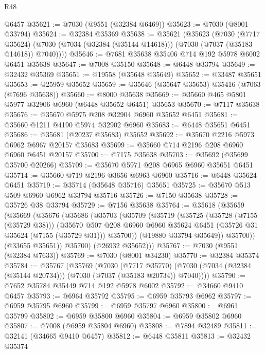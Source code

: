 \begin{lexlean}{R48}
\begin{coremodule}
    @6457
@35621 := @7030 (@9551 (@32384 @6469))
@35623 := @7030 (@8001 @33794)
@35624 := @32384 @35369
@35638 := @35621
    (@35623
      (@7030
        (@7717 @35624)
        (@7030 (@7034 (@32384 (@35144 @14618))) (@7030 (@7037 (@35183 @14618)) @7040))))
@35646 := @7681 @35638 @35406 @714 @192 @5978 @6002 @6451 @35638
@35647 := @7008 @35150
@35648 := @6448 @33794
@35649 := @32432 @35369
@35651 := @19558 (@35648 @35649)
@35652 := @33487 @35651
@35653 := @25959 @35652
@35659 := @35646 (@35647 @35653) @35416 (@7063 (@7696 @35638))
@35660 := @8000 @35638
@35669 := @35660 @465 @5801 @5977 @32906 @6960 (@6448 @35652 @6451) @35653
@35670 := @7117 @35638
@35676 := @35670 @5975 @208 @32904 @6960 @35652 @6451
@35681 := @35660 @1211 @4190 @5974 @32902 @6960
@35683 := @6448 @35651 @6451
@35686 := @35681 (@20237 @35683) @35652
@35692 := @35670 @2216 @5973 @6962 @6967 @20157 @35683
@35699 := @35660 @714 @2196 @208 @6960 @6960 @6451 @20157
@35700 := @7175 @35638
@35703 := @35692 (@35699 @35700 @20266)
@35709 := @35670 @5971 @208 @6965 @6960 @35651 @6451
@35714 := @35660 @719 @2196 @3656 @6963 @6960
@35716 := @6448 @35624 @6451
@35719 := @35714 (@35648 @35716) @35651
@35725 := @35670 @513 @509 @6960 @6962 @33794 @35716
@35726 := @7150 @35638
@35728 := @35726 @38 @33794
@35729 := @7156 @35638
@35764 := @35618
    (@35659
      (@35669
        (@35676
          (@35686
            (@35703
              (@35709
                (@35719
                  (@35725
                    (@35728 (@7155 (@35729 @38)))
                    (@35670
                      @507
                      @208
                      @6960
                      @6960
                      @35624
                      @6451
                      (@35726 @31 @35624 (@7155 (@35729 @31)))
                      @35700))
                  (@19880 @33794 @35649))
                @35700))
            (@33655 @35651))
          @35700)
        (@26932 @35652)))
@35767 := @7030 (@9551 (@32384 @7633))
@35769 := @7030 (@8001 @34230)
@35770 := @32384 @35374
@35784 := @35767
    (@35769
      (@7030
        (@7717 @35770)
        (@7030 (@7034 (@32384 (@35144 @20734))) (@7030 (@7037 (@35183 @20734)) @7040))))
@35790 := @7652 @35784 @35449 @714 @192 @5978 @6002
@35792 := @34660 @9410 @6457
@35793 := @6964 @35792
@35795 := @6959 @35793 @6962
@35797 := @6959 @35795 @6960
@35799 := @6959 @35797 @6960
@35800 := @6961 @35799
@35802 := @6959 @35800 @6960
@35804 := @6959 @35802 @6960
@35807 := @7008 (@6959 @35804 @6960)
@35808 := @7894 @32489
@35811 := @32141 (@34665 @9410 @6457)
@35812 := @6448 @35811
@35813 := @32432 @35374

\end{coremodule}
\end{lexlean}
